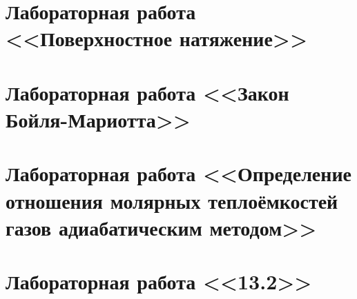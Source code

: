 \documentclass[bachelor, och, referat]{SCWorks}
\begin{document}
\section{Лабораторная работа <<Поверхностное натяжение>>}



\section{Лабораторная работа <<Закон Бойля-Мариотта>>}



\section{Лабораторная работа <<Определение отношения молярных теплоёмкостей газов адиабатическим методом>>}



\section{Лабораторная работа <<13.2>>}


\end{document}
